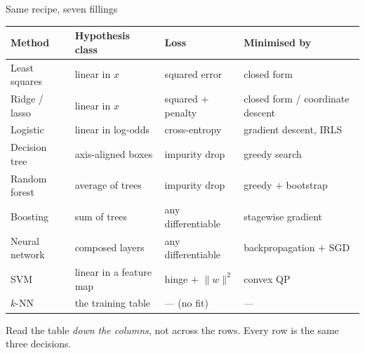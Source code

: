 \documentclass[aspectratio=169]{beamer}
\begin{document}
\begin{frame}[shrink=10]{Same recipe, seven fillings}
  \centering
  \begin{tabular}{@{}llll@{}}
    \toprule
    \textbf{Method} & \textbf{Hypothesis class} & \textbf{Loss} &
      \textbf{Minimised by} \\
    \midrule
    Least squares      & linear in $x$      & squared error    & closed form \\
    Ridge / lasso      & linear in $x$      & squared $+$ penalty & closed form / coordinate descent \\
    Logistic           & linear in log-odds & cross-entropy    & gradient descent, IRLS \\
    Decision tree      & axis-aligned boxes & impurity drop    & greedy search \\
    Random forest      & average of trees   & impurity drop    & greedy $+$ bootstrap \\
    Boosting           & sum of trees       & any differentiable & stagewise gradient \\
    Neural network     & composed layers    & any differentiable & backpropagation $+$ SGD \\
    SVM                & linear in a feature map & hinge $+$ $\lVert w\rVert^2$ & convex QP \\
    $k$-NN             & the training table & --- (no fit)     & --- \\
    \bottomrule
  \end{tabular}
  \vspace{0.5em}
  \begin{center}
    \small Read the table \emph{down the columns}, not across the rows. Every
    row is the same three decisions.
  \end{center}
\end{frame}
\end{document}

